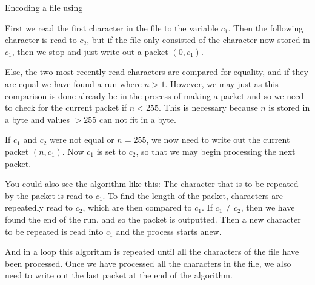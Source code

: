 \begin{algorithm}
  \caption{Encoding a file using \rle}
  \label{alg:rle-enc}
  \begin{algorithmic}[1]


    \While{\True}


    \If{\eof}
    \Break
    \EndIf

    \Else
    \State {}
    \State {}

    \EndIf

    \EndWhile

    \State {}
    \State {}
  \end{algorithmic}
\end{algorithm}

First we read the first character in the file to the variable
$c_1$. Then the following character is read to $c_2$, but if the file
only consisted of the character now stored in $c_1$, then we stop and
just write out a packet $(0,c_1)$.

Else, the two most recently read characters are compared for equality,
and if they are equal we have found a run where $n > 1$. However, we
may just as this comparison is done already be in the process of
making a packet and so we need to check for the current packet if $n <
255$. This is necessary because $n$ is stored in a byte and values $>
255$ can not fit in a byte.

If $c_1$ and $c_2$ were not equal or $n = 255$, we now need to write
out the current packet $(n,c_1)$. Now $c_1$ is set to $c_2$, so that
we may begin processing the next packet.

You could also see the algorithm like this: The character that is to
be repeated by the packet is read to $c_1$. To find the length of the
packet, characters are repeatedly read to $c_2$, which are then
compared to $c_1$. If $c_1 \neq c_2$, then we have found the end of
the run, and so the packet is outputted. Then a new character to be
repeated is read into $c_1$ and the process starts anew.

And in a loop this algorithm is repeated until all the characters of
the file have been processed. Once we have processed all the
characters in the file, we also need to write out the last packet at
the end of the algorithm.

